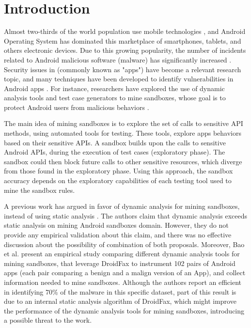 \section{Introduction}

Almost two-thirds of the world population use mobile technologies \cite{Comscore}, and Android Operating System has dominated this marketplace of smartphones, tablets, and others electronic devices. Due to this growing popularity, the number of incidents related to Android malicious software (malware) has significantly increased \cite{faruki2014android,tan2015securing}. Security issues in (commonly known as "apps") have become a relevant research topic, and many techniques have been developed to identify vulnerabilities in Android apps \cite{tan2015securing}. For instance, researchers have explored the use of dynamic analysis tools and test case generators to mine sandboxes, whose goal is to protect Android users from malicious behaviors \cite{jamrozik2016mining}.

The main idea of mining sandboxes is to explore the set of calls to sensitive API methods, using automated tools for testing. These tools, explore apps behaviors based on their sensitive APIs. A sandbox builds upon the calls to sensitive Android APIs, during the execution of test cases (exploratory phase). The sandbox could then block future calls to other sensitive resources, which diverge from those found in the exploratory phase. Using this approach, the sandbox accuracy depends on the exploratory capabilities of each testing tool used to mine the sandbox rules.

A previous work has argued in favor of dynamic analysis for mining sandboxes, instead of using static analysis \cite{jamrozik2016mining}. The authors claim that dynamic analysis exceeds static analysis on mining Android sandboxes domain. However, they do not provide any empirical validation about this claim, and there was no effective discussion about the possibility of combination of both proposals. Moreover, Bao et al. \cite{bao2018mining} present an empirical study comparing different dynamic analysis tools for mining sandboxes, that leverage DroidFax \cite{cai2017droidfax} to instrument 102 pairs of Android apps (each pair comparing a benign and a malign version of an App), and collect information needed to mine sandboxes. Although the authors report an efficient in identifying 70\% of the malware in this specific dataset, part of this result is due to an internal static analysis algorithm of DroidFax, which might improve the performance of the dynamic analysis tools for mining sandboxes, introducing a possible threat to the work.


